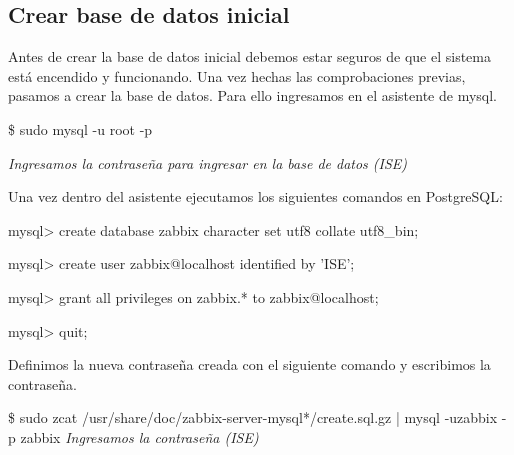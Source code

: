     \subsection{Crear base de datos inicial}
    Antes de crear la base de datos inicial debemos estar seguros de que el sistema está encendido y funcionando. Una vez hechas las comprobaciones previas,
    pasamos a crear la base de datos. Para ello ingresamos en el asistente de mysql.
        \begin{tcolorbox}[colback=black!10, halign=left]
            \$ sudo mysql -u root -p

            \emph{Ingresamos la contraseña para ingresar en la base de datos (ISE)}
        \end{tcolorbox}

    Una vez dentro del asistente ejecutamos los siguientes comandos en PostgreSQL:
        \begin{tcolorbox}[colback=black!10, halign=left]
            mysql> create database zabbix character set utf8 collate utf8\_bin;

            mysql> create user zabbix@localhost identified by 'ISE';

            mysql> grant all privileges on zabbix.* to zabbix@localhost;

            mysql> quit;
        \end{tcolorbox}

    Definimos la nueva contraseña creada con el siguiente comando y escribimos la contraseña.
        \begin{tcolorbox}[colback=black!10, halign=left]
            \$ sudo zcat /usr/share/doc/zabbix-server-mysql*/create.sql.gz | mysql -uzabbix -p zabbix
            \emph{Ingresamos la contraseña (ISE)}
        \end{tcolorbox}

